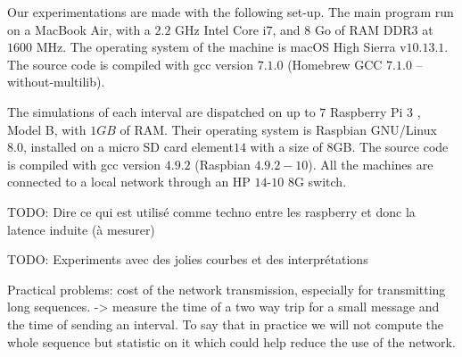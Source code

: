 \documentclass[a4paper,10pt]{article}
\newcommand{\todo}[1]{{\color{red} TODO: {#1}}}
\begin{document}
Our experimentations are made with the following set-up.
The main program run on a MacBook Air, with a $2.2$ GHz Intel Core i$7$, and $8$ Go of RAM DDR$3$ at $1600$ MHz. The operating system of the machine is macOS High Sierra v$10.13.1$. The source code is compiled with  gcc version $7.1.0$ (Homebrew GCC $7.1.0$ -- without-multilib).

The simulations of each interval are dispatched on up to $7$ Raspberry Pi $3$ , Model B, with $1GB$ of RAM. Their operating system is  Raspbian GNU/Linux $8.0$, installed on a micro SD card element$14$ with a size of $8$GB. The source code is compiled with gcc version $4.9.2$ (Raspbian $4.9.2-10$). All the machines are connected to a local network through an HP $14$-$10$ $8$G switch.


\todo{Dire ce qui est utilisé comme techno entre les raspberry et donc la latence induite (à mesurer)}

\todo{Experiments avec des jolies courbes et des interprétations}


Practical problems: cost of the network transmission, especially for transmitting long sequences.
-> measure the time of a two way trip for a small message and the time of sending an interval.
To say that in practice we will not compute the whole sequence but statistic on it which could help
reduce the use of the network.
\end{document}
